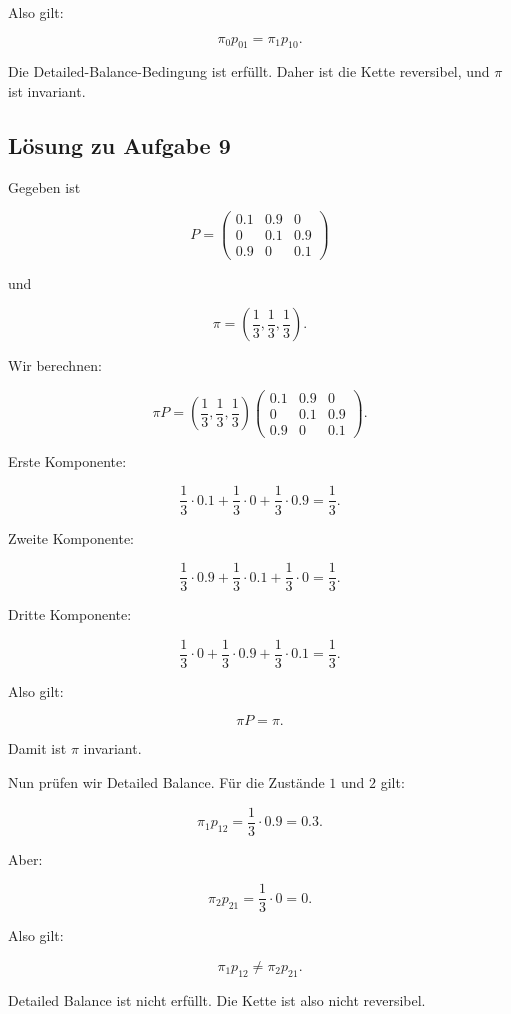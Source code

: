 \documentclass[11pt,a4paper]{article}
\begin{document}
Also gilt:

\[
\pi_0p_{01}
=
\pi_1p_{10}.
\]

Die Detailed-Balance-Bedingung ist erfüllt. Daher ist die Kette reversibel, und $\pi$ ist invariant.

\subsection*{Lösung zu Aufgabe 9}

Gegeben ist

\[
P =
\begin{pmatrix}
0.1 & 0.9 & 0 \\
0 & 0.1 & 0.9 \\
0.9 & 0 & 0.1
\end{pmatrix}
\]

und

\[
\pi=
\left(
\frac13,\frac13,\frac13
\right).
\]

Wir berechnen:

\[
\pi P
=
\left(
\frac13,\frac13,\frac13
\right)
\begin{pmatrix}
0.1 & 0.9 & 0 \\
0 & 0.1 & 0.9 \\
0.9 & 0 & 0.1
\end{pmatrix}.
\]

Erste Komponente:

\[
\frac13\cdot 0.1+\frac13\cdot 0+\frac13\cdot 0.9
=
\frac13.
\]

Zweite Komponente:

\[
\frac13\cdot 0.9+\frac13\cdot 0.1+\frac13\cdot 0
=
\frac13.
\]

Dritte Komponente:

\[
\frac13\cdot 0+\frac13\cdot 0.9+\frac13\cdot 0.1
=
\frac13.
\]

Also gilt:

\[
\pi P=\pi.
\]

Damit ist $\pi$ invariant.

Nun prüfen wir Detailed Balance. Für die Zustände $1$ und $2$ gilt:

\[
\pi_1p_{12}
=
\frac13\cdot 0.9
=
0.3.
\]

Aber:

\[
\pi_2p_{21}
=
\frac13\cdot 0
=
0.
\]

Also gilt:

\[
\pi_1p_{12}\neq \pi_2p_{21}.
\]

Detailed Balance ist nicht erfüllt. Die Kette ist also nicht reversibel.
\end{document}
